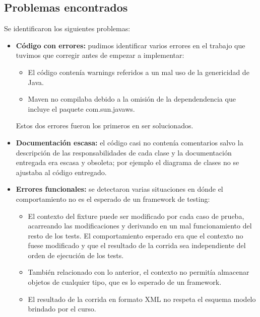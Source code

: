 \documentclass[12pt]{article}
\begin{document}
\subsection{Problemas encontrados}
Se identificaron los siguientes problemas:

\begin{itemize}
	\item \textbf{Código con errores:} pudimos identificar varios errores en el trabajo que tuvimos que
		corregir antes de empezar a implementar:
		
		\begin{itemize}
			\item El código contenía warnings referidos a un mal uso de la genericidad de Java.
			
			\item Maven no compilaba debido a la omisión de la dependendencia que incluye el paquete 
				com.sun.javaws.				
		\end{itemize}
		
		Estos dos errores fueron los primeros en ser solucionados.
		
	\item \textbf{Documentación escasa:} el código casi no contenía comentarios salvo la descripción de las
		responsabilidades de cada clase y la documentación entregada era escasa y obsoleta; 
		por ejemplo el diagrama de clases no se ajustaba al código entregado.
		
	\item \textbf{Errores funcionales:} se detectaron varias situaciones en dónde el comportamiento
		no es el esperado de un framework de testing:
		
		\begin{itemize}
			\item El contexto del fixture puede ser modificado por cada caso de prueba, acarreando las
				modificaciones y derivando en un mal funcionamiento del resto de los tests.
				El comportamiento esperado era que el contexto no fuese modificado y que el
				resultado de la corrida sea independiente del orden de ejecución de los tests.

			\item También relacionado con lo anterior, el contexto no permitía almacenar objetos de cualquier 
				tipo, que es lo esperado de un framework.
				
			\item El resultado de la corrida en formato XML no respeta el esquema modelo brindado por 
				el curso.
				

\end{itemize}
\end{itemize}
\end{document}
